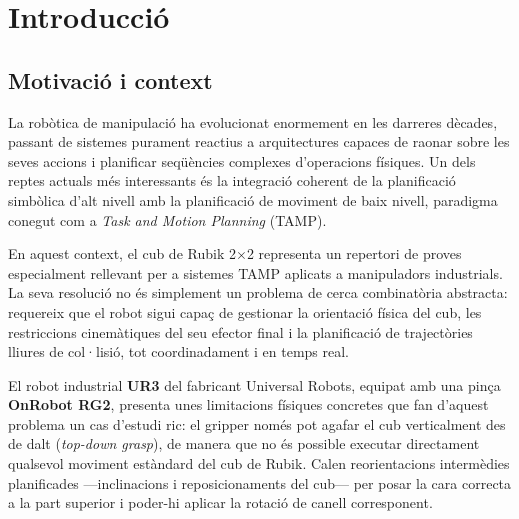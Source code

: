 \documentclass[12pt, a4paper]{article}
\begin{document}
\newpage
\tableofcontents
\newpage

\pagestyle{fancy}
\fancyhf{}
\rhead{\textcolor{upcblue}{\small Robòtica Avançada — Manipuladors}}
\lhead{\textcolor{gray}{\small Resolució d'un Cub de Rubik 2$\times$2 amb UR3}}
\cfoot{\thepage}
\renewcommand{\headrulewidth}{0.4pt}


\section{Introducció}

\subsection{Motivació i context}

La robòtica de manipulació ha evolucionat enormement en les darreres dècades, passant de sistemes purament reactius a arquitectures capaces de raonar sobre les seves accions i planificar seqüències complexes d'operacions físiques. Un dels reptes actuals més interessants és la integració coherent de la planificació simbòlica d'alt nivell amb la planificació de moviment de baix nivell, paradigma conegut com a \textit{Task and Motion Planning} (TAMP).

En aquest context, el cub de Rubik 2$\times$2 representa un repertori de proves especialment rellevant per a sistemes TAMP aplicats a manipuladors industrials. La seva resolució no és simplement un problema de cerca combinatòria abstracta: requereix que el robot sigui capaç de gestionar la orientació física del cub, les restriccions cinemàtiques del seu efector final i la planificació de trajectòries lliures de col·lisió, tot coordinadament i en temps real.

El robot industrial \textbf{UR3} del fabricant Universal Robots, equipat amb una pinça \textbf{OnRobot RG2}, presenta unes limitacions físiques concretes que fan d'aquest problema un cas d'estudi ric: el gripper només pot agafar el cub verticalment des de dalt (\textit{top-down grasp}), de manera que no és possible executar directament qualsevol moviment estàndard del cub de Rubik. Calen reorientacions intermèdies planificades —inclinacions i reposicionaments del cub— per posar la cara correcta a la part superior i poder-hi aplicar la rotació de canell corresponent.
\end{document}
